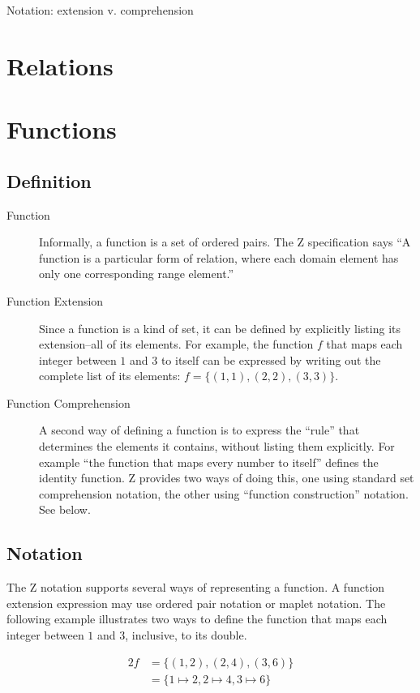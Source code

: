 \documentclass[reqno,12pt]{tufte-book}
\numberwithin{equation}{subsection}
\begin{document}
Notation: extension v. comprehension


\section{Relations}

\section{Functions}


\subsection{Definition}

\begin{description}
\item [Function] Informally, a function is a set of ordered pairs.
  The Z specification says ``A function is a particular form of
  relation, where each domain element has only one corresponding range
  element.''\cite{z-iso-13568}%
\item [Function Extension] Since a function is a kind of set, it can
  be defined by explicitly listing its extension--all of its elements.
  For example, the function $f$ that maps each integer between $1$ and
  $3$ to itself can be expressed by writing out the complete list of
  its elements: ${f=\{(1,1),(2,2),(3,3)\}}$.
\item [Function Comprehension] A second way of defining a function is
  to express the ``rule'' that determines the elements it contains,
  without listing them explicitly.  For example ``the function that
  maps every number to itself'' defines the identity function.  Z provides
  two ways of doing this, one using standard set comprehension
  notation, the other using ``function construction'' notation.  See
  below.
\end{description}

\subsection{Notation}

The Z notation supports several ways of representing a function.  A
function extension expression may use ordered pair notation or maplet
notation.  The following example illustrates two ways to define the
function that maps each integer between $1$ and $3$, inclusive, to its
double.

\begin{alignat}{2}
  f &= \{(1,2),(2,4),(3,6)\} \\
  &= \{1\mapsto 2, 2\mapsto 4, 3\mapsto 6\}
\end{alignat}
\end{document}
